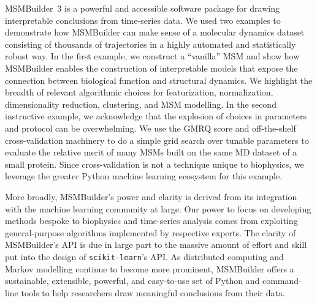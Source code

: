 MSMBuilder~3 is a powerful and accessible software package for drawing
interpretable conclusions from time-series data. We used two examples to
demonstrate how MSMBuilder can make sense of a molecular dynamics dataset
consisting of thousands of trajectories in a highly automated and
statistically robust way. In the first example, we construct a ``vanilla''
MSM and show how MSMBuilder enables the construction of
interpretable models that expose the connection between biological function
and structural dynamics.  We highlight the breadth of relevant algorithmic choices for
featurization, normalization, dimensionality reduction, clustering, and MSM
modelling.  In the second instructive example, we acknowledge that the
explosion of choices in parameters and protocol can be overwhelming. We use
the GMRQ score and off-the-shelf cross-validation machinery to do a simple
grid search over tunable parameters to evaluate the relative merit of many
MSMs built on the same MD dataset of a small protein. Since
cross-validation is not a technique unique to biophysics, we leverage the
greater Python machine learning ecosystem for this example.

More broadly, MSMBuilder's power and clarity is derived from its integration
with the machine learning community at large. Our power to focus on
developing methods bespoke to biophysics and time-series analysis comes
from exploiting general-purpose algorithms implemented by respective
experts. The clarity of MSMBuilder's API is due in large part to the
massive amount of effort and skill put into the design of
\texttt{scikit-learn}'s API. As distributed computing and Markov modelling
continue to become more prominent, MSMBuilder offers a sustainable,
extensible, powerful, and easy-to-use set of Python and command-line tools
to help researchers draw meaningful conclusions from their data.

